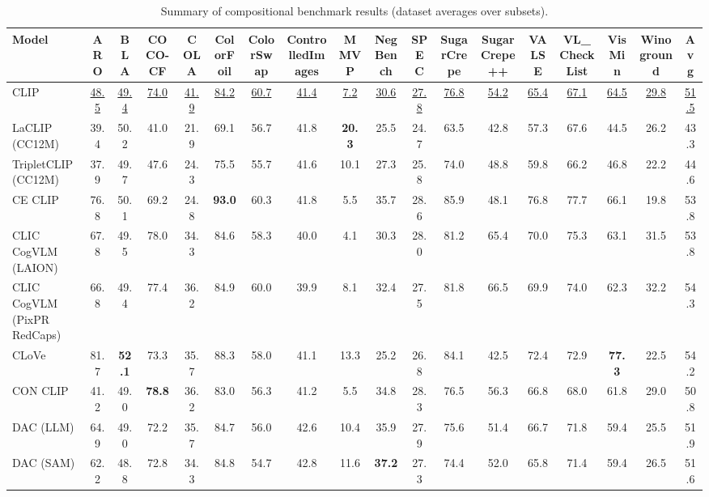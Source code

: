 \begin{table}[t]
  \centering
  \scriptsize
  \caption{Summary of compositional benchmark results (dataset averages over subsets).}
  \label{tab:summary_compositional}
  \begin{adjustbox}{max width=\textwidth}
  \setlength{\tabcolsep}{2pt}
  \begin{tabular}{lccccccccccccccccc}
    \toprule
    Model & ARO & BLA & COCO-CF & COLA & ColorFoil & ColorSwap & ControlledImages & MMVP & NegBench & SPEC & SugarCrepe & SugarCrepe++ & VALSE & VL\_CheckList & VisMin & Winoground & Avg \\
    \midrule
    CLIP & \underline{48.5} & \underline{49.4} & \underline{74.0} & \underline{41.9} & \underline{84.2} & \underline{60.7} & \underline{41.4} & \underline{7.2} & \underline{30.6} & \underline{27.8} & \underline{76.8} & \underline{54.2} & \underline{65.4} & \underline{67.1} & \underline{64.5} & \underline{29.8} & \underline{51.5} \\
    \midrule
    LaCLIP (CC12M) & 39.4 & 50.2 & 41.0 & 21.9 & 69.1 & 56.7 & 41.8 & \textbf{20.3} & 25.5 & 24.7 & 63.5 & 42.8 & 57.3 & 67.6 & 44.5 & 26.2 & 43.3 \\
    TripletCLIP (CC12M) & 37.9 & 49.7 & 47.6 & 24.3 & 75.5 & 55.7 & 41.6 & 10.1 & 27.3 & 25.8 & 74.0 & 48.8 & 59.8 & 66.2 & 46.8 & 22.2 & 44.6 \\
    \midrule
    CE CLIP & 76.8 & 50.1 & 69.2 & 24.8 & \textbf{93.0} & 60.3 & 41.8 & 5.5 & 35.7 & 28.6 & 85.9 & 48.1 & 76.8 & 77.7 & 66.1 & 19.8 & 53.8 \\
    CLIC CogVLM (LAION) & 67.8 & 49.5 & 78.0 & 34.3 & 84.6 & 58.3 & 40.0 & 4.1 & 30.3 & 28.0 & 81.2 & 65.4 & 70.0 & 75.3 & 63.1 & 31.5 & 53.8 \\
    CLIC CogVLM (PixPR RedCaps) & 66.8 & 49.4 & 77.4 & 36.2 & 84.9 & 60.0 & 39.9 & 8.1 & 32.4 & 27.5 & 81.8 & 66.5 & 69.9 & 74.0 & 62.3 & 32.2 & 54.3 \\
    CLoVe & 81.7 & \textbf{52.1} & 73.3 & 35.7 & 88.3 & 58.0 & 41.1 & 13.3 & 25.2 & 26.8 & 84.1 & 42.5 & 72.4 & 72.9 & \textbf{77.3} & 22.5 & 54.2 \\
    CON CLIP & 41.2 & 49.0 & \textbf{78.8} & 36.2 & 83.0 & 56.3 & 41.2 & 5.5 & 34.8 & 28.3 & 76.5 & 56.3 & 66.8 & 68.0 & 61.8 & 29.0 & 50.8 \\
    DAC (LLM) & 64.9 & 49.0 & 72.2 & 35.7 & 84.7 & 56.0 & 42.6 & 10.4 & 35.9 & 27.9 & 75.6 & 51.4 & 66.7 & 71.8 & 59.4 & 25.5 & 51.9 \\
    DAC (SAM) & 62.2 & 48.8 & 72.8 & 34.3 & 84.8 & 54.7 & 42.8 & 11.6 & \textbf{37.2} & 27.3 & 74.4 & 52.0 & 65.8 & 71.4 & 59.4 & 26.5 & 51.6 \\

\end{tabular}
\end{adjustbox}
\end{table}
